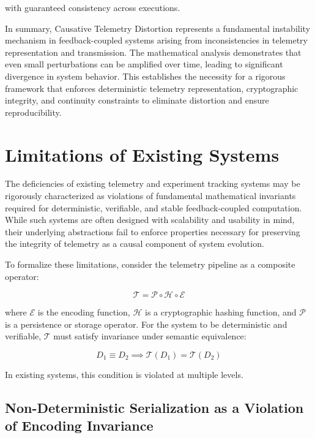 with guaranteed consistency across executions.

In summary, Causative Telemetry Distortion represents a fundamental instability mechanism in feedback-coupled systems arising from inconsistencies in telemetry representation and transmission. The mathematical analysis demonstrates that even small perturbations can be amplified over time, leading to significant divergence in system behavior. This establishes the necessity for a rigorous framework that enforces deterministic telemetry representation, cryptographic integrity, and continuity constraints to eliminate distortion and ensure reproducibility.
\section{Limitations of Existing Systems}

The deficiencies of existing telemetry and experiment tracking systems may be rigorously characterized as violations of fundamental mathematical invariants required for deterministic, verifiable, and stable feedback-coupled computation. While such systems are often designed with scalability and usability in mind, their underlying abstractions fail to enforce properties necessary for preserving the integrity of telemetry as a causal component of system evolution.

To formalize these limitations, consider the telemetry pipeline as a composite operator:

\begin{equation}
\mathcal{T} = \mathcal{P} \circ \mathcal{H} \circ \mathcal{E}
\end{equation}

where $\mathcal{E}$ is the encoding function, $\mathcal{H}$ is a cryptographic hashing function, and $\mathcal{P}$ is a persistence or storage operator. For the system to be deterministic and verifiable, $\mathcal{T}$ must satisfy invariance under semantic equivalence:

\begin{equation}
D_1 \equiv D_2 \implies \mathcal{T}(D_1) = \mathcal{T}(D_2)
\end{equation}

In existing systems, this condition is violated at multiple levels.

\subsection{Non-Deterministic Serialization as a Violation of Encoding Invariance}

